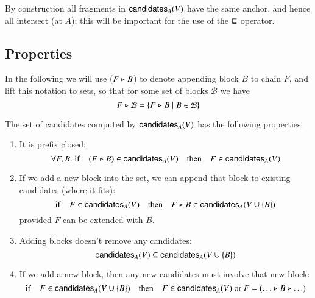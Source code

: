 By construction all fragments in $\mathsf{candidates}_A(V)$ have the same anchor, and
hence all intersect (at $A$); this will be important for the use of the
$\mathrel{\sqsubseteq}$ operator.

\subsection{Properties}

In the following we will use ($F \mathrel{\triangleright} B$) to denote appending block $B$ to chain
$F$, and lift this notation to sets, so that for some set of blocks
$\mathcal{B}$ we have
%
\begin{equation*}
F \mathrel{\triangleright} \mathcal{B} = \{ F \mathrel{\triangleright} B \mid B \in \mathcal{B} \}
\end{equation*}

\begin{lemma}
\label{candidates:properties}
The set of candidates computed by $\mathsf{candidates}_A(V)$ has the following
properties.

\begin{enumerate}

\item \label{candidates:prefixclosed}
It is prefix closed:
\begin{equation*}
\forall F, B .\;
\mathrm{if} \quad (F \mathrel{\triangleright} B) \in \mathsf{candidates}_A(V) \quad \mathrm{then} \quad F \in \mathsf{candidates}_A(V)
\end{equation*}

\item \label{candidates:appendnew}
If we add a new block into the set, we can append that block to existing
candidates (where it fits):
\begin{equation*}
\mathrm{if} \quad F \in \mathsf{candidates}_A(V) \quad \mathrm{then} \quad F \mathrel{\triangleright} B \in \mathsf{candidates}_A(V \cup \{ B \})
\end{equation*}
provided $F$ can be extended with $B$.

\item \label{candidates:monotone}
Adding blocks doesn't remove any candidates:
\begin{equation*}
\mathsf{candidates}_A(V) \subseteq \mathsf{candidates}_A(V \cup \{B\})
\end{equation*}

\item \label{candidates:musthavenew}
If we add a new block, then any new candidates must involve that new block:
\begin{equation*}
\mathrm{if} \quad F \in \mathsf{candidates}_A(V \cup \{B\}) \quad \mathrm{then} \quad F \in \mathsf{candidates}_A(V) \text{ or } F = (\ldots \mathrel{\triangleright} B \mathrel{\triangleright} \ldots)
\end{equation*}

\end{enumerate}
\end{lemma}

